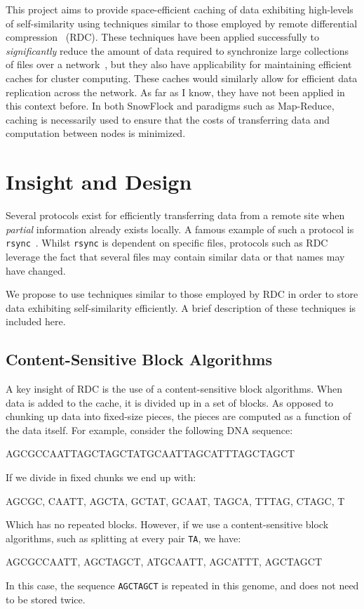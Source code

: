 \documentclass{article}[12pt]
\begin{document}
This project aims to provide space-efficient caching of data exhibiting
high-levels of self-similarity using techniques similar to those employed by
remote differential compression~\cite{rdc} (RDC).  These techniques have been
applied successfully to {\em significantly} reduce the amount of data required
to synchronize large collections of files over a network~\cite{improvedfile},
but they also have applicability for maintaining efficient caches for cluster
computing.  These caches would similarly allow for efficient data replication
across the network.  As far as I know, they have not been applied in this
context before.  In both SnowFlock and paradigms such as Map-Reduce, caching is
necessarily used to ensure that the costs of transferring data and computation
between nodes is minimized.

\section{Insight and Design}
\label{sec:insight}

Several protocols exist for efficiently transferring data from a remote site
when {\em partial} information already exists locally.  A famous example of
such a protocol is {\tt rsync}~\cite{rsync}.  Whilst {\tt rsync} is dependent
on specific files, protocols such as RDC~\cite{rdc} leverage the fact that
several files may contain similar data or that names may have changed.

We propose to use techniques similar to those employed by RDC in order to
store data exhibiting self-similarity efficiently.  A brief description of
these techniques is included here.

\subsection*{Content-Sensitive Block Algorithms}

A key insight of RDC is the use of a content-sensitive block algorithms.  When
data is added to the cache, it is divided up in a set of blocks.  As opposed to
chunking up data into fixed-size pieces, the pieces are computed as a function
of the data itself.  For example, consider the following DNA sequence:
\begin{center}
AGCGCCAATTAGCTAGCTATGCAATTAGCATTTAGCTAGCT
\end{center}
If we divide in fixed chunks we end up with:
\begin{center}
AGCGC, CAATT, AGCTA, GCTAT, GCAAT, TAGCA, TTTAG, CTAGC, T
\end{center}
Which has no repeated blocks.  However, if we use a content-sensitive block
algorithms, such as splitting at every pair {\tt TA}, we have:
\begin{center}
AGCGCCAATT, AGCTAGCT, ATGCAATT, AGCATTT, AGCTAGCT
\end{center}
In this case, the sequence {\tt AGCTAGCT} is repeated in this genome, and does
not need to be stored twice.
\end{document}

